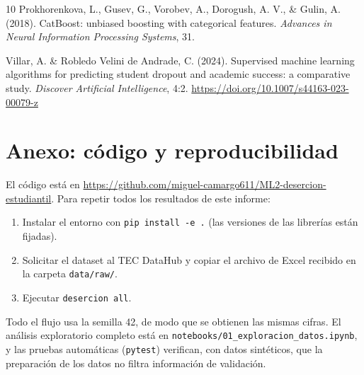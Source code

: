 \documentclass[11pt,a4paper]{article}
\newcommand{\us}{\_\allowbreak}
\newcommand{\repo}{\url{https://github.com/miguel-camargo611/ML2-desercion-estudiantil}}
\begin{document}
\begin{thebibliography}{10}
Prokhorenkova, L., Gusev, G., Vorobev, A., Dorogush, A. V., \& Gulin, A. (2018). CatBoost: unbiased boosting with categorical features. \textit{Advances in Neural Information Processing Systems}, 31.

Villar, A. \& Robledo Velini de Andrade, C. (2024). Supervised machine learning algorithms for predicting student dropout and academic success: a comparative study. \textit{Discover Artificial Intelligence}, 4:2. \url{https://doi.org/10.1007/s44163-023-00079-z}

\end{thebibliography}

\section*{Anexo: código y reproducibilidad}

El código está en \repo. Para repetir todos los resultados de este informe:
\begin{enumerate}[leftmargin=1.5em,itemsep=1pt,topsep=2pt]
\item Instalar el entorno con \texttt{pip install -e .} (las versiones de las librerías están fijadas).
\item Solicitar el dataset al TEC DataHub y copiar el archivo de Excel recibido en la carpeta \texttt{data/raw/}.
\item Ejecutar \texttt{desercion all}.
\end{enumerate}
Todo el flujo usa la semilla 42, de modo que se obtienen las mismas cifras. El análisis exploratorio completo está en \texttt{notebooks/01\us exploracion\us datos.ipynb}, y las pruebas automáticas (\texttt{pytest}) verifican, con datos sintéticos, que la preparación de los datos no filtra información de validación.
\end{document}
